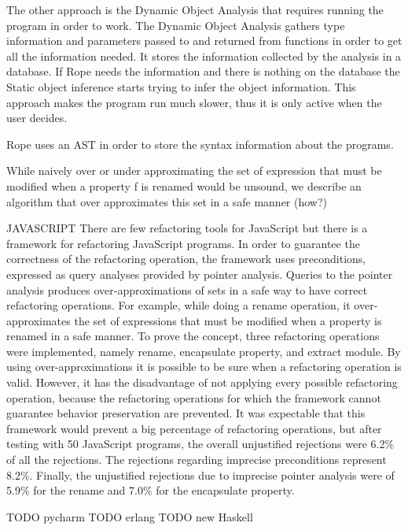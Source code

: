 The other approach is the Dynamic Object Analysis that requires running
the program in order to work.
The Dynamic Object Analysis gathers type information and parameters passed to and returned from
functions in order to get all the information needed.
It stores the information collected by the analysis in a database.
If Rope needs the information and there is nothing on the database the Static
object inference starts trying to infer the object information.
This approach makes the program run much slower, thus it is only active when
the user decides.

Rope uses an AST in order to store the syntax information about the programs.

While naively over or under approximating the set of expression that must be modified when a property f
is renamed would be unsound, we describe an algorithm that over approximates this set in a safe manner
(how?)

JAVASCRIPT
There are few refactoring tools for JavaScript but there is a framework
\cite{feldthaus2011tool} for refactoring JavaScript programs. %
In order to guarantee the correctness of the refactoring operation, the framework
uses preconditions, expressed as query analyses provided by pointer analysis. %
Queries to the pointer analysis produces over-approximations of sets in a safe way to
have correct refactoring operations.
For example, while doing a rename operation, it over-approximates the set of expressions
that must be modified when a property is renamed in a safe manner.
To prove the concept, three refactoring operations were implemented, namely rename,
encapsulate property, and extract module.
By using over-approximations it is possible to be sure when a refactoring
operation is valid.
However, it has the disadvantage of not applying every possible refactoring operation,
because the refactoring operations for which the framework cannot guarantee behavior
preservation are prevented.
It was expectable that this framework would prevent a big percentage of refactoring
operations, but after testing with 50 JavaScript programs,
the overall unjustified rejections were 6.2\% of all the rejections.
The rejections regarding imprecise preconditions represent 8.2\%.
Finally, the unjustified rejections due to imprecise pointer analysis were of
5.9\% for the rename and 7.0\% for the encapsulate property.

TODO pycharm
TODO erlang
TODO new Haskell
